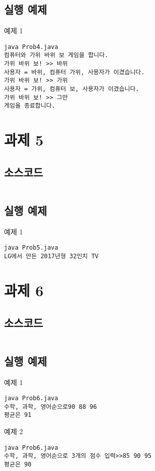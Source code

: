 \documentclass{article}
\theoremstyle{nonumberplain}
\begin{document}
\subsection{실행 예제}
예제 1
\begin{code}
\begin{verbatim}
java Prob4.java
컴퓨터와 가위 바위 보 게임을 합니다.
가위 바위 보! >> 바위
사용자 = 바위, 컴퓨터 가위, 사용자가 이겼습니다.
가위 바위 보! >> 가위
사용자 = 가위, 컴퓨터 보, 사용자가 이겼습니다.
가위 바위 보! >> 그만
게임을 종료합니다.
\end{verbatim}
\end{code}



\section{과제 5}
\subsection{소스코드}
\begin{code}
\inputminted{java}{java/Prob5.java}
\end{code}
\subsection{실행 예제}
예제 1
\begin{code}
\begin{verbatim}
java Prob5.java
LG에서 만든 2017년형 32인치 TV
\end{verbatim}
\end{code}



\section{과제 6}
\subsection{소스코드}
\begin{code}
\inputminted{java}{java/Prob6.java}
\end{code}
\subsection{실행 예제}
예제 1
\begin{code}
\begin{verbatim}
java Prob6.java
수학, 과학, 영어순으로90 88 96
평균은 91
\end{verbatim}
\end{code}
예제 2
\begin{code}
\begin{verbatim}
java Prob6.java
수학, 과학, 영어순으로 3개의 점수 입력>>85 90 95
평균은 90
\end{verbatim}
\end{code}
\end{document}

